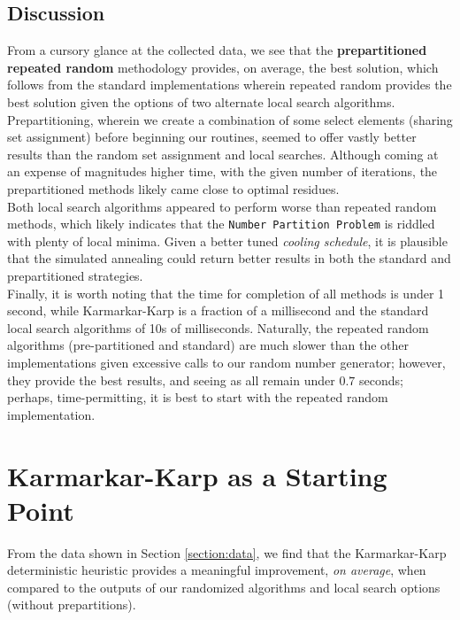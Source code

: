\documentclass[conference]{styles/acmsiggraph}
\newcommand{\?}{\stackrel{?}{=}}
\begin{document}
\subsection{Discussion}
From a cursory glance at the collected data, we see that the \textbf{prepartitioned repeated random} methodology provides, on average, the best solution, which follows from the standard implementations wherein repeated random provides the best solution given the options of two alternate local search algorithms.  Prepartitioning, wherein we create a combination of some select elements (sharing set assignment) before beginning our routines, seemed to offer vastly better results than the random set assignment and local searches.  Although coming at an expense of magnitudes higher time, with the given number of iterations, the prepartitioned methods likely came close to optimal residues. \\

Both local search algorithms appeared to perform worse than repeated random methods, which likely indicates that the \verb|Number Partition Problem| is riddled with plenty of local minima.  Given a better tuned \textit{cooling schedule}, it is plausible that the simulated annealing could return better results in both the standard and prepartitioned strategies. \\

Finally, it is worth noting that the time for completion of all methods is under 1 second, while Karmarkar-Karp is a fraction of a millisecond and the standard local search algorithms of 10s of milliseconds.  Naturally, the repeated random algorithms (pre-partitioned and standard) are much slower than the other implementations given excessive calls to our random number generator; however, they provide the best results, and seeing as all remain under $0.7$ seconds; perhaps, time-permitting, it is best to start with the repeated random implementation.



\newpage

\section{Karmarkar-Karp as a Starting Point}
From the data shown in Section \ref{section:data}, we find that the Karmarkar-Karp deterministic heuristic provides a meaningful improvement, \textit{on average}, when compared to the outputs of our randomized algorithms and local search options (without prepartitions).  \\
\end{document}
